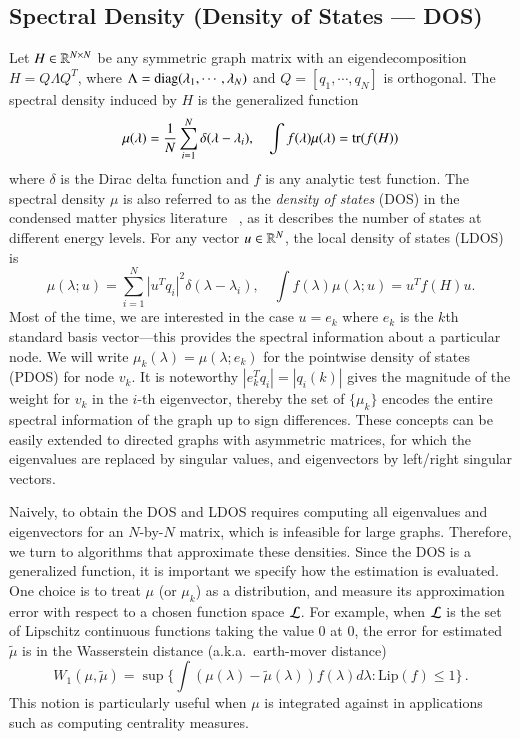 \subsection{Spectral Density (Density of States --- DOS)}
Let $H\in\mathbb{R}^{N\times N}$ be any symmetric graph matrix with an
eigendecomposition $H = Q\Lambda Q^T$, where $\Lambda = \operatorname{diag} 
(\lambda_1,\cdots,\lambda_N)$ and $Q = [q_1,\cdots, q_N]$ is orthogonal. The
spectral density induced by $H$ is the generalized function
\begin{equation}\label{eqn:dos}
  \mu(\lambda) = \frac{1}{N}\sum_{i=1}^N \delta(\lambda - \lambda_i), \quad \int
  f(\lambda) \mu(\lambda) = \operatorname{tr}(f(H))
\end{equation}
where $\delta$ is the Dirac delta function and $f$ is any analytic test
function. The spectral density $\mu$ is also referred to as the \emph{density
of states} (DOS) in the condensed matter physics literature~
\cite{weisse2006kernel}, as it describes the number of states at different
energy levels. For any vector $u\in\mathbb{R}^N$, the local density of states (LDOS)
is
\begin{equation}\label{eqn:ldos}
  \mu(\lambda; u) = \sum_{i=1}^N|u^Tq_i|^2\delta(\lambda-\lambda_i), \quad \int
  f(\lambda)\mu(\lambda; u) = u^T f(H) u.
\end{equation}
Most of the time, we are interested in the case $u=e_k$ where $e_k$ is the $k$th
standard basis vector---this provides the spectral information about a
particular node. We will write $\mu_k(\lambda) = \mu(\lambda; e_k)$ for the
pointwise density of states (PDOS) for node $v_k$. It is noteworthy $|e_k^Tq_i|
= |q_i(k)|$ gives the magnitude of the weight for $v_k$ in the $i$-th
eigenvector, thereby the set of $\{\mu_k\}$ encodes the entire spectral
information of the graph up to sign differences. These concepts can be easily
extended to directed graphs with asymmetric matrices, for which the eigenvalues
are replaced by singular values, and eigenvectors by left/right singular
vectors.

Naively, to obtain the DOS and LDOS requires computing all eigenvalues and
eigenvectors for an $N$\hyp{}by\hyp{}$N$ matrix, which is infeasible for large
graphs. Therefore, we turn to algorithms that approximate these densities. Since
the DOS is a generalized function, it is important we specify how the estimation
is evaluated. One choice is to treat $\mu$ (or $\mu_k$) as a distribution, and
measure its  approximation error with respect to a chosen function space
$\mathcal{L}$. For  example, when $\mathcal{L}$ is the set of Lipschitz continuous functions
taking the value 0 at 0, the error for estimated $\widetilde{\mu}$ is in the
Wasserstein distance (a.k.a.\ earth-mover distance)~\cite{kantorovich1958space}
\begin{equation}\label{eqn:waisserstein}
W_1(\mu,\widetilde{\mu}) = \sup\Big\{\int (\mu(\lambda)-\widetilde{\mu}(\lambda
))f(\lambda)d\lambda : \text{Lip}(f)\leq 1\Big\}\,.
\end{equation}
This notion is particularly useful when $\mu$ is integrated against in 
applications such as computing centrality measures.

